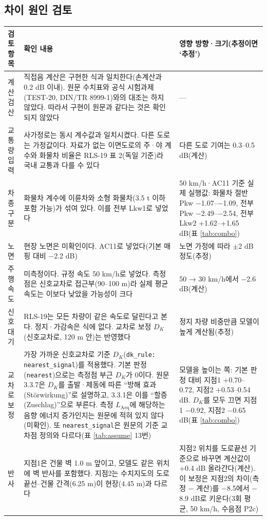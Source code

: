 \documentclass[10.5pt,a4paper]{article}
\newcommand{\Laeq}{\ensuremath{L_{\mathrm{Aeq}}}}
\newcommand{\hd}[1]{\cellcolor{headfill}\textbf{\sffamily #1}}
\begin{document}
\clearpage\subsection{차이 원인 검토}\label{sec:cause}
\footnotesize
\begin{longtable}{L{0.14}L{0.52}L{0.34}}
\toprule
\hd{검토 항목} & \hd{확인 내용} & \hd{영향 방향·크기(추정이면 `추정')} \\ \midrule
\endhead
\bottomrule
\endlastfoot
계산 검산 & 직접음 계산은 구현한 식과 일치한다(손계산과 0.2 dB 이내). 원문 수치표와 공식 시험과제(TEST-20, DIN/TR 8999-1)와의 대조는 하지 않았다. 따라서 구현이 원문과 같다는 것은 확인되지 않았다 & --- \\ \midrule
교통량 입력 & 사가정로는 동시 계수값과 일치시켰다. 다른 도로는 가정값이다. 자료가 없는 이면도로의 주·야 계수와 화물차 비율은 RLS-19 표 2(독일 기준)라 국내 교통과 다를 수 있다 & 다른 도로 기여는 0.3--0.5 dB(계산) \\ \midrule
차종 구분 & 화물차 계수에 이륜차와 소형 화물차(3.5 t 이하 포함 가능)가 섞여 있다. 이를 전부 Lkw1로 넣었다 & 50 km/h·AC11 기준 실제 실행값: 화물차 절반 Pkw $-$1.07--$-$1.09, 전부 Pkw $-$2.49--$-$2.54, 전부 Lkw2 +1.62--+1.65 dB(표 \ref{tab:combo}) \\ \midrule
노면 & 현장 노면은 미확인이다. AC11로 넣었다(기본 매핑 대비 $-$2.2 dB) & 노면 가정에 따라 $\pm$2 dB 정도(추정) \\ \midrule
주행속도 & 미측정이다. 규정 속도 50 km/h로 넣었다. 측정점은 신호교차로 접근부(90--100 m)라 실제 평균 속도는 이보다 낮았을 가능성이 크다 & 50 → 30 km/h에서 $-$2.6 dB(계산) \\ \midrule
신호 대기 & RLS-19는 모든 차량이 같은 속도로 달린다고 본다. 정지·가감속은 식에 없다. 교차로 보정 $D_K$(신호교차로, 120 m 안)는 반영했다 & 정지 차량 비중만큼 모델이 높게 계산됨(추정) \\ \midrule
교차로 보정 & 가장 가까운 신호교차로 기준 $D_K$(\texttt{dk\_rule: nearest\_signal})를 적용했다. 기본 판정(\texttt{nearest})으로는 측정점 부근 $D_K$가 0이다. 원문 3.3.7은 $D_K$를 출발·제동에 따른 ``방해 효과(Störwirkung)''로 설명하고, 3.3.1은 이를 ``할증(Zuschlag)''으로 부른다. 측정 \Laeq 에 해당하는 음향 에너지 증가인지는 원문에 적혀 있지 않다(미확인). 또 \texttt{nearest\_signal}은 원문의 기준 교차점 정의와 다르다(표 \ref{tab:assume} 13번) & 모델을 높이는 쪽: 기본 판정 대비 지점1 +0.70--0.72, 지점2 +0.53--0.54 dB. $D_K$를 모두 끄면 지점1 $-$0.92, 지점2 $-$0.65 dB(표 \ref{tab:combo}) \\ \midrule
반사 & 지점1은 건물 벽 1.0 m 앞이고, 모델도 같은 위치에 벽 반사를 포함했다. 지점2는 수치지도의 도로끝선--건물 간격(6.25 m)이 현장(4.45 m)과 다르다 & 지점2 위치를 도로끝선 기준으로 바꾸면 계산값이 +0.4 dB 올라간다(계산). 이 보정은 지점2의 차이(측정 $-$ 계산)를 $-$8.5에서 $-$8.9 dB로 키운다(3회 평균, 50 km/h, 수음점 P2c) \\ \midrule

\end{longtable}
\end{document}
